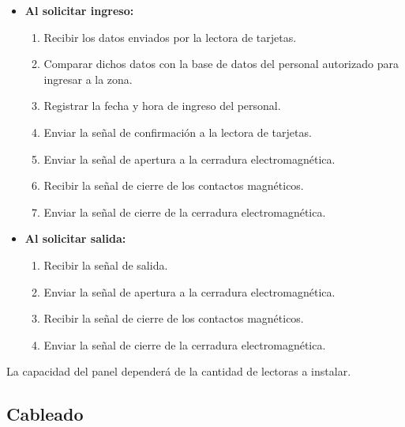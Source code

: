\begin{itemize}
	
	\item \textbf{Al solicitar ingreso:}


\begin{enumerate}
	
	\item Recibir los datos enviados por la lectora de tarjetas.
	
	\item Comparar dichos datos con la base de datos del personal autorizado para ingresar a la zona.
	
	\item Registrar la fecha y hora de ingreso del personal.
	
	\item Enviar la señal de confirmación a la lectora de tarjetas.
	
	\item Enviar la señal de apertura a la cerradura electromagnética.
	
	\item Recibir la señal de cierre de los contactos magnéticos.
	
	\item Enviar la señal de cierre de la cerradura electromagnética.
	
	
\end{enumerate}


	\item \textbf{Al solicitar salida:}

\begin{enumerate}
	
	\item Recibir la señal de salida.
	
	\item Enviar la señal de apertura a la cerradura electromagnética.
	
	\item Recibir la señal de cierre de los contactos magnéticos.
	
	\item Enviar la señal de cierre de la cerradura electromagnética.
		
\end{enumerate}


\end{itemize}


La capacidad del panel dependerá de la cantidad de lectoras a instalar.


\subsection{Cableado}


